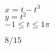 {$x=t-t^3$\\$y=t^2$\\$-1\leq t\leq 1\pi$

\noindent\begin{minipage}{\linewidth}
\centering
{}
\end{minipage}
}
{$8/15$
}

